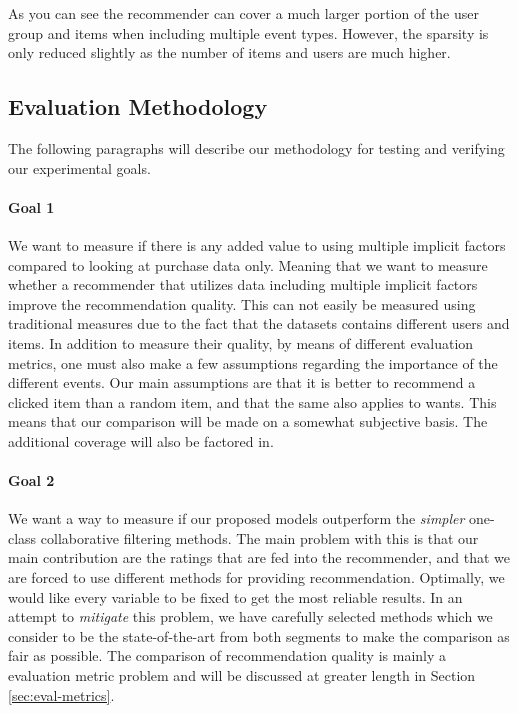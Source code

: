 As you can see the recommender can cover a much larger portion of the user group
and items when including multiple event types. However, the sparsity is only reduced slightly
as the number of items and users are much higher.


\subsection{Evaluation Methodology}

The following paragraphs will describe our methodology for testing and verifying our experimental
goals.

\paragraph{Goal 1}

We want to measure if there is any added value to using multiple implicit factors compared to
looking at purchase data only. Meaning that we want to measure whether a recommender that utilizes
data including multiple implicit factors improve the recommendation quality. This can not
easily be measured using traditional measures due to the fact that the datasets contains
different users and items. In addition to measure their quality, by means of different
evaluation metrics, one must also make a few assumptions regarding the importance
of the different events. Our main assumptions are that it is better to recommend a clicked
item than a random item, and that the same also applies to wants. This means that our comparison
will be made on a somewhat subjective basis. The additional coverage will also be factored in. 

\paragraph{Goal 2}

We want a way to measure if our proposed models outperform the \emph{simpler} one-class
collaborative filtering methods. The main problem with this is that our main contribution
are the ratings that are fed into the recommender, and that we are forced to use different
methods for providing recommendation. Optimally, we would like every variable to be fixed
to get the most reliable results. In an attempt to \emph{mitigate} this problem, we 
have carefully selected methods which we consider to be the state-of-the-art from both segments
to make the comparison as fair as possible. The comparison of recommendation quality
is mainly a evaluation metric problem and will be discussed at greater length in
Section \ref{sec:eval-metrics}.

